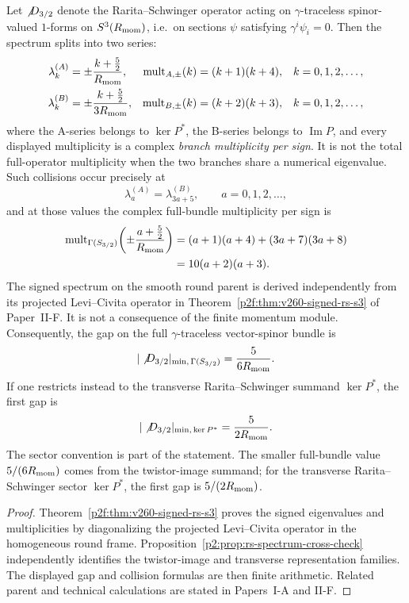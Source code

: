 \documentclass[12pt,a4paper]{article}
\begin{document}
\begin{theorem}
\label{p2:thm:spin32-spectrum}
Let $\slashed{D}_{3/2}$ denote the Rarita--Schwinger operator acting on $\gamma$-traceless
spinor-valued $1$-forms on $S^3(\Rmom)$, i.e.\ on sections $\psi$ satisfying
$\gamma^i\psi_i=0$. Then the spectrum splits into two series:
\begin{align}
\lambda^{(A)}_k &= \pm \frac{k+\tfrac52}{\Rmom},
& \operatorname{mult}_{A,\pm}(k) &= (k+1)(k+4),
& k&=0,1,2,\dots, \\
\lambda^{(B)}_k &= \pm \frac{k+\tfrac52}{3\Rmom},
& \operatorname{mult}_{B,\pm}(k) &= (k+2)(k+3),
& k&=0,1,2,\dots,
\end{align}
where the A-series belongs to \(\ker P^*\), the B-series belongs to
\(\operatorname{Im}P\), and every displayed multiplicity is a complex
\emph{branch multiplicity per sign}.  It is not the total full-operator
multiplicity when the two branches share a numerical eigenvalue.  Such
collisions occur precisely at
\[
\lambda^{(A)}_a=\lambda^{(B)}_{3a+5},
\qquad a=0,1,2,\ldots,
\]
and at those values the complex full-bundle multiplicity per sign is
\[
\begin{aligned}
\operatorname{mult}_{\Gamma(S_{3/2})}
\!\left(\pm\frac{a+\tfrac52}{\Rmom}\right)
&=(a+1)(a+4)+(3a+7)(3a+8)\\
&=10(a+2)(a+3).
\end{aligned}
\]
The signed spectrum on the smooth round parent is derived independently from its projected Levi--Civita operator in Theorem~\ref{p2f:thm:v260-signed-rs-s3} of Paper~II-F. It is not a consequence of the finite momentum module. Consequently, the gap on the full \(\gamma\)-traceless vector-spinor bundle is
\begin{equation}
|\slashed{D}_{3/2}|_{\min,\,\Gamma(S_{3/2})}=\frac{5}{6\Rmom}.
\end{equation}
If one restricts instead to the transverse Rarita--Schwinger summand \(\ker P^*\), the first gap is
\begin{equation}
|\slashed{D}_{3/2}|_{\min,\,\ker P^*}=\frac{5}{2\Rmom}.
\end{equation}
The sector convention is part of the statement.  The smaller full-bundle
value \(5/(6\Rmom)\) comes from the twistor-image summand; for the transverse
Rarita--Schwinger sector \(\ker P^*\), the first gap is
\(5/(2\Rmom)\).
\end{theorem}

\begin{proof}
Theorem~\ref{p2f:thm:v260-signed-rs-s3} proves the signed eigenvalues
and multiplicities by diagonalizing the projected Levi--Civita operator
in the homogeneous round frame. Proposition~\ref{p2:prop:rs-spectrum-cross-check}
independently identifies the twistor-image and transverse representation
families. The displayed gap and collision formulas are then finite arithmetic. 
Related parent and technical calculations are stated in Papers~I-A and II-F.
\end{proof}
\end{document}
